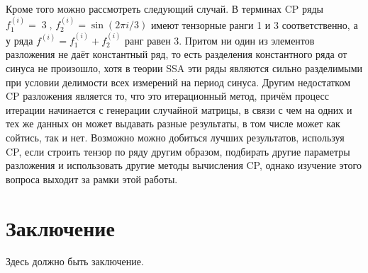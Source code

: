 \documentclass[specialist,
    substylefile = spbu_report.rtx,
    subf,href,colorlinks=true, 12pt]{disser}
\theoremstyle{plain}
\theoremstyle{definition}
\theoremstyle{remark}
\begin{document}
    Кроме того можно рассмотреть следующий случай.
    В терминах CP ряды $f_1^{(i)}=\operatorname{3},\, f_2^{(i)}=\sin{(2\pi i / 3)}$ имеют тензорные ранги 1 и 3
    соответственно, а у ряда $f^{(i)}=f_1^{(i)}+f_2^{(i)}$ ранг равен 3.
    Притом ни один из элементов разложения не даёт константный ряд, то есть разделения константного ряда
    от синуса не произошло, хотя в теории SSA эти ряды являются сильно разделимыми при условии делимости всех
    измерений на период синуса.
%    
    Другим недостатком CP разложения является то, что это итерационный метод, причём процесс итерации начинается
    с генерации случайной матрицы, в связи с чем на одних и тех же данных он может выдавать разные результаты, в том
    числе может как сойтись, так и нет.
    Возможно можно добиться лучших результатов, используя CP, если строить тензор по ряду другим образом, подбирать
    другие параметры разложения и использовать другие методы вычисления CP, однако изучение этого вопроса выходит
    за рамки этой работы\@.

    \newpage


    \section{Заключение}\label{sec:conclusion}
    Здесь должно быть заключение.

    
    
\end{document}
